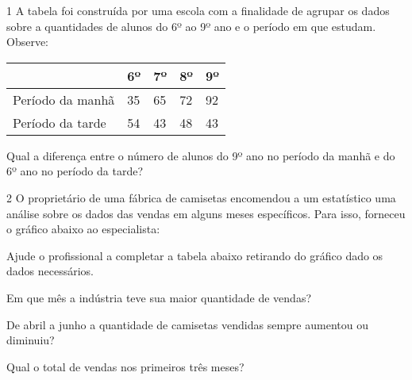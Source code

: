 
\num{1} A tabela foi construída por uma escola com a finalidade de agrupar
os dados sobre a quantidades de alunos do 6º ao 9º ano e o período
em que estudam. Observe:

\begin{longtable}[]{@{}lllll@{}}
\toprule
& 6º & 7º & 8º & 9º\tabularnewline
\midrule
\endhead
Período da manhã & 35 & 65 & 72 & 92\tabularnewline
Período da tarde & 54 & 43 & 48 & 43\tabularnewline
\bottomrule
\end{longtable}

Qual a diferença entre o número de alunos do 9º ano no período da manhã
e do 6º ano no período da tarde?



\num{2} O proprietário de uma fábrica de camisetas encomendou a um
estatístico uma análise sobre os dados das vendas em alguns
meses específicos. Para isso, forneceu o gráfico abaixo ao especialista:


\begin{escolha}
\item
  Ajude o profissional a completar a tabela abaixo retirando do gráfico
  dado os dados necessários.


\item
  Em que mês a indústria teve sua maior quantidade de vendas?


\item
  De abril a junho a quantidade de camisetas vendidas sempre aumentou ou
  diminuiu?


\item
  Qual o total de vendas nos primeiros três meses?

\end{escolha}


